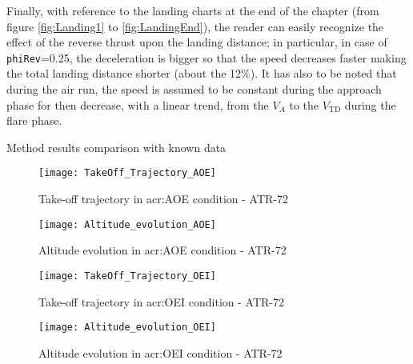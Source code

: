 \bigskip
\noindent
Finally, with reference to the landing charts at the end of the chapter (from figure \ref{fig:Landing1} to \ref{fig:LandingEnd}), the reader can easily recognize the effect of the reverse thrust upon the landing distance; in particular, in case of \lstinline[language=Java]!phiRev!=0.25, the deceleration is bigger so that the speed decreases faster making the total landing distance shorter (about the 12\%). It has also to be noted that during the air run, the speed is assumed to be constant during the approach phase for then decrease, with a linear trend, from the $V_A$ to the $V_{\text{TD}}$ during the flare phase. 
%
\begin{table}[H]
\caption{Method results comparison with known data}
\end{table}
%
\clearpage
%
%
%
\begin{figure}[H]
\centering
\texttt{[image: TakeOff\_Trajectory\_AOE]}
\caption{Take-off trajectory in \gls{acr:AOE} condition - ATR-72}
\end{figure}
%
\begin{figure}[H]
\centering
\texttt{[image: Altitude\_evolution\_AOE]}
\caption{Altitude evolution in \gls{acr:AOE} condition - ATR-72}
\end{figure}
%
\begin{figure}[H]
\centering
\texttt{[image: TakeOff\_Trajectory\_OEI]}
\caption{Take-off trajectory in \gls{acr:OEI} condition - ATR-72}
\end{figure}
%
\begin{figure}[H]
\centering
\texttt{[image: Altitude\_evolution\_OEI]}
\caption{Altitude evolution in \gls{acr:OEI} condition - ATR-72}
\end{figure}

